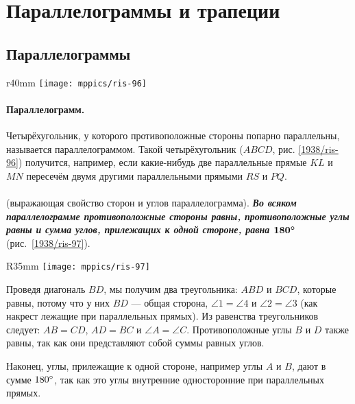 \section{Параллелограммы и трапеции}

\subsection*{Параллелограммы}

{

\begin{wrapfigure}{r}{40mm}
\vskip-5mm
\centering
\texttt{[image: mppics/ris-96]}
\caption{}\label{1938/ris-96}
\end{wrapfigure}

\paragraph{Параллелограмм.}\label{1938/87}
Четырёхугольник, у которого противоположные стороны попарно параллельны, называется параллелограммом.
Такой четырёхугольник ($ABCD$, рис. \ref{1938/ris-96}) получится, например, если какие-нибудь две параллельные прямые $KL$ и $MN$ пересечём двумя другими параллельными прямыми $RS$ и $PQ$.

}

\paragraph{}\label{1938/88}
\mbox{} (выражающая свойство сторон и углов параллелограмма).
\textbf{\emph{Во всяком параллелограмме противоположные стороны равны, противоположные углы равны и сумма углов, прилежащих к одной стороне, равна $\bm{180\degree}$}} (рис.~\ref{1938/ris-97}).

\begin{wrapfigure}{R}{35mm}
\centering
\texttt{[image: mppics/ris-97]}
\caption{}\label{1938/ris-97}
\end{wrapfigure}

Проведя диагональ $BD$, мы получим два треугольника:
$ABD$ и $BCD$, которые равны, потому что у них $BD$ — общая сторона, $\angle 1 = \angle 4$ и $\angle 2 = \angle 3$ (как накрест лежащие при параллельных прямых).
Из равенства треугольников следует:
$AB=CD$, $AD=BC$ и $\angle A = \angle C$.
Противоположные углы $B$ и $D$ также равны, так как они представляют собой суммы равных углов.

Наконец, углы, прилежащие к одной стороне, например углы $A$ и $B$, дают в сумме $180\degree$, так как это углы внутренние односторонние при параллельных прямых.

